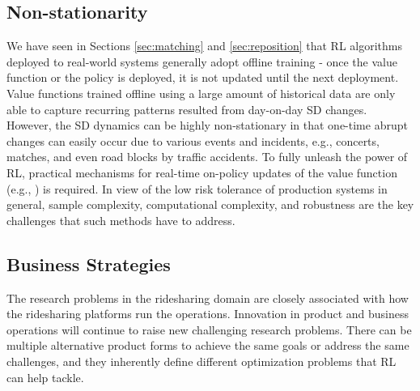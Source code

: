 \documentclass{article}
\begin{document}
\subsection{Non-stationarity}
We have seen in Sections \ref{sec:matching} and \ref{sec:reposition} that RL algorithms deployed to real-world systems generally adopt offline training - once the value function or the policy is deployed, it is not updated until the next deployment. Value functions trained offline using a large amount of historical data are only able to capture recurring patterns resulted from day-on-day SD changes. However, the SD dynamics can be highly non-stationary in that one-time abrupt changes can easily occur due to various events and incidents, e.g., concerts, matches, and even road blocks by traffic accidents. To fully unleash the power of RL, practical mechanisms for real-time on-policy updates of the value function (e.g., \citep{tang2021value,tong2021combinatorial,eshkevari2022reinforcement}) is required. In view of the low risk tolerance of production systems in general, sample complexity, computational complexity, and robustness are the key challenges that such methods have to address.

\subsection{Business Strategies}
The research problems in the ridesharing domain are closely associated with how the ridesharing platforms run the operations. Innovation in product and business operations will continue to raise new challenging research problems. There can be multiple alternative product forms to achieve the same goals or address the same challenges, and they inherently define different optimization problems that RL can help tackle. 
\end{document}
